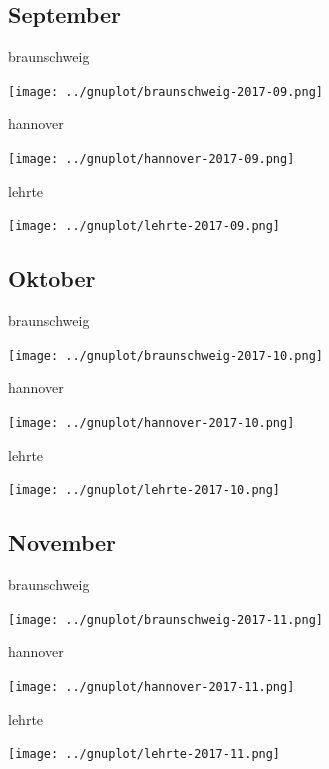 \documentclass[aspectratio=169]{beamer} %
\begin{document}
\subsection{September}
\begin{frame}{braunschweig}
  \begin{center}
    \texttt{[image: ../gnuplot/braunschweig-2017-09.png]}
  \end{center}
\end{frame}
\begin{frame}{hannover}
  \begin{center}
    \texttt{[image: ../gnuplot/hannover-2017-09.png]}
  \end{center}
\end{frame}
\begin{frame}{lehrte}
  \begin{center}
    \texttt{[image: ../gnuplot/lehrte-2017-09.png]}
  \end{center}
\end{frame}

\subsection{Oktober}
\begin{frame}{braunschweig}
  \begin{center}
    \texttt{[image: ../gnuplot/braunschweig-2017-10.png]}
  \end{center}
\end{frame}
\begin{frame}{hannover}
  \begin{center}
    \texttt{[image: ../gnuplot/hannover-2017-10.png]}
  \end{center}
\end{frame}
\begin{frame}{lehrte}
  \begin{center}
    \texttt{[image: ../gnuplot/lehrte-2017-10.png]}
  \end{center}
\end{frame}

\subsection{November}
\begin{frame}{braunschweig}
  \begin{center}
    \texttt{[image: ../gnuplot/braunschweig-2017-11.png]}
  \end{center}
\end{frame}
\begin{frame}{hannover}
  \begin{center}
    \texttt{[image: ../gnuplot/hannover-2017-11.png]}
  \end{center}
\end{frame}
\begin{frame}{lehrte}
  \begin{center}
    \texttt{[image: ../gnuplot/lehrte-2017-11.png]}
  \end{center}
\end{frame}
\end{document}

